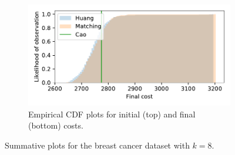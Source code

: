 \documentclass[11pt]{article}
\begin{document}
\begin{figure}
\begin{subfigure}{.5\textwidth}
        \includegraphics[width=\linewidth]{Fig1b2.pdf}
        \caption{Empirical CDF plots for initial (top) and final (bottom)
                 costs.}
    \end{subfigure}
    \caption{Summative plots for the breast cancer dataset with \(k=8\).}%
    \label{fig:breast_cancer_knee}
\end{figure}
\end{document}
